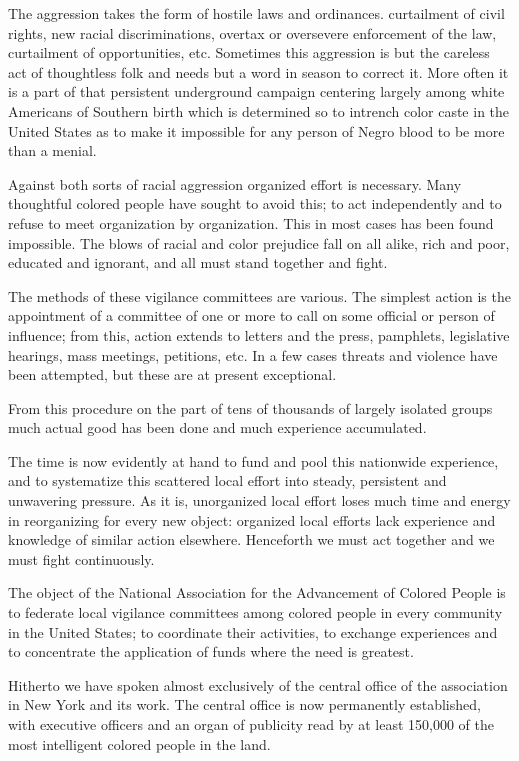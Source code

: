 \documentclass[letterpaper,10pt,english]{jupyterBook}
\begin{document}
\sphinxAtStartPar
The aggression takes the form of hostile laws and ordinances. curtailment of civil rights, new racial discriminations, overtax or oversevere enforcement of the law, curtailment of opportunities, etc. Sometimes this aggression is but the careless act of thoughtless folk and needs but a word in season to correct it. More often it is a part of that persistent underground campaign centering largely among white Americans of Southern birth which is determined so to intrench color caste in the United States as to make it impossible for any person of Negro blood to be more than a menial.

\sphinxAtStartPar
Against both sorts of racial aggression organized effort is necessary. Many thoughtful colored people have sought to avoid this; to act independently and to refuse to meet organization by organization. This in most cases has been found impossible. The blows of racial and color prejudice fall on all alike, rich and poor, educated and ignorant, and all must stand together and fight.

\sphinxAtStartPar
The methods of these vigilance committees are various. The simplest action is the appointment of a committee of one or more to call on some official or person of influence; from this, action extends to letters and the press, pamphlets, legislative hearings, mass meetings, petitions, etc. In a few cases threats and violence have been attempted, but these are at present exceptional.

\sphinxAtStartPar
From this procedure on the part of tens of thousands of largely isolated groups much actual good has been done and much experience accumulated.

\sphinxAtStartPar
The time is now evidently at hand to fund and pool this nation\sphinxhyphen{}wide experience, and to systematize this scattered local effort into steady, persistent and unwavering pressure. As it is, unorganized local effort loses much time and energy in reorganizing for every new object: organized local efforts lack experience and knowledge of similar action elsewhere. Henceforth we must act together and we must fight continuously.

\sphinxAtStartPar
The object of the National Association for the Advancement of Colored People is to federate local vigilance committees among colored people in every community in the United States; to coordinate their activities, to exchange experiences and to concentrate the application of funds where the need is greatest.

\sphinxAtStartPar
Hitherto we have spoken almost exclusively of the central office of the association in New York and its work. The central office is now permanently established, with executive officers and an organ of publicity read by at least 150,000 of the most intelligent colored people in the land.
\end{document}
